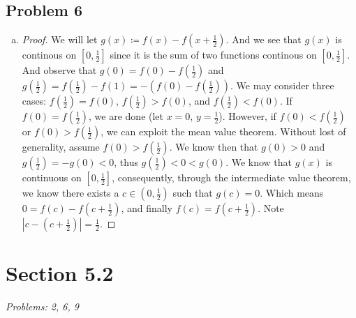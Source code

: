 \documentclass[12pt]{article}
\begin{document}
\subsection*{Problem 6}
\begin{enumerate}[a).]
    \item {
        \begin{proof}
            We will let $g(x) \coloneq f(x) - f(x + \frac{1}{2})$. 
            And we see that $g(x)$ is continous on $[0,\frac{1}{2}]$ since it is the sum of two functions continous on $[0,\frac{1}{2}]$.
            And observe that $g(0) = f(0) - f(\frac{1}{2})$ and $g(\frac{1}{2}) = f(\frac{1}{2}) - f(1) = -(f(0) - f(\frac{1}{2})) $. 
            We may consider three cases: $f(\frac{1}{2}) = f(0)$, $f(\frac{1}{2}) > f(0)$, and $f(\frac{1}{2}) < f(0)$. 
            If $f(0) = f(\frac{1}{2})$, we are done (let $x = 0$, $y = \frac{1}{2}$). 
            However, if $f(0) < f(\frac{1}{2})$ or $f(0) > f(\frac{1}{2})$, we can exploit the mean value theorem. 
            Without lost of generality, assume $f(0) > f(\frac{1}{2})$. 
            We know then that $g(0) > 0$ and $g(\frac{1}{2}) = - g(0) < 0$, thus $g(\frac{1}{2}) < 0 < g(0)$. 
            We know that $g(x)$ is continuous on $[0,\frac{1}{2}]$, consequently, through the intermediate value theorem, we know there exists a $c \in (0,\frac{1}{2})$ such that $g(c) = 0$.
            Which means $0 = f(c) - f(c+\frac{1}{2})$, and finally $f(c) = f(c+\frac{1}{2})$. Note $|c - (c+\frac{1}{2})| = \frac{1}{2}$.
            
        \end{proof}
    }
\end{enumerate}

\vspace*{1cm}


\section*{Section 5.2}
\textit{Problems: 2, 6, 9}
\end{document}
